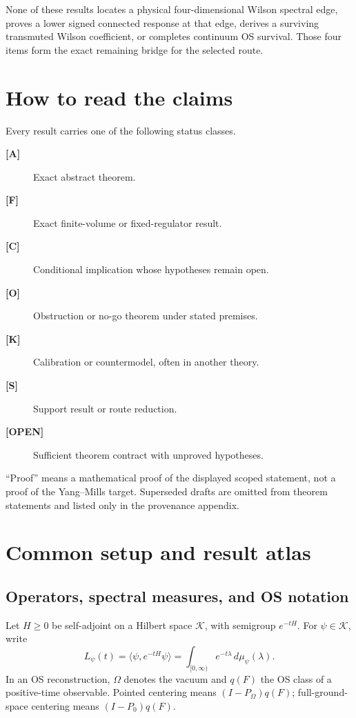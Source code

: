 \documentclass[11pt,oneside]{report}
\theoremstyle{definition}
\theoremstyle{remark}
\newcommand{\class}[1]{\textbf{[#1]}}
\begin{document}
None of these results locates a physical four-dimensional Wilson spectral
edge, proves a lower signed connected response at that edge, derives a
surviving transmuted Wilson coefficient, or completes continuum OS survival.
Those four items form the exact remaining bridge for the selected route.

\chapter*{How to read the claims}
Every result carries one of the following status classes.
\begin{description}
\item[\class{A}] Exact abstract theorem.
\item[\class{F}] Exact finite-volume or fixed-regulator result.
\item[\class{C}] Conditional implication whose hypotheses remain open.
\item[\class{O}] Obstruction or no-go theorem under stated premises.
\item[\class{K}] Calibration or countermodel, often in another theory.
\item[\class{S}] Support result or route reduction.
\item[\class{OPEN}] Sufficient theorem contract with unproved hypotheses.
\end{description}
``Proof'' means a mathematical proof of the displayed scoped statement, not a
proof of the Yang--Mills target. Superseded drafts are omitted from theorem
statements and listed only in the provenance appendix.

\tableofcontents
\clearpage
{}

\chapter{Common setup and result atlas}

\section{Operators, spectral measures, and OS notation}
Let $H\geq0$ be self-adjoint on a Hilbert space $\mathcal K$, with semigroup
$e^{-tH}$. For $\psi\in\mathcal K$, write
\[
 L_\psi(t)=\langle\psi,e^{-tH}\psi\rangle
 =\int_{[0,\infty)}e^{-t\lambda}\,d\mu_\psi(\lambda).
\]
In an OS reconstruction, $\Omega$ denotes the vacuum and $q(F)$ the OS class
of a positive-time observable. Pointed centering means
$(I-P_\Omega)q(F)$; full-ground-space centering means $(I-P_0)q(F)$.
\end{document}
